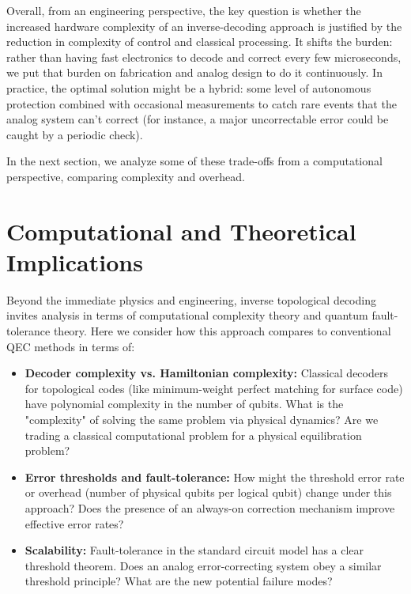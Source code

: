 \documentclass[11pt]{article}
\begin{document}
Overall, from an engineering perspective, the key question is whether the increased hardware complexity of an inverse-decoding approach is justified by the reduction in complexity of control and classical processing. It shifts the burden: rather than having fast electronics to decode and correct every few microseconds, we put that burden on fabrication and analog design to do it continuously. In practice, the optimal solution might be a hybrid: some level of autonomous protection combined with occasional measurements to catch rare events that the analog system can't correct (for instance, a major uncorrectable error could be caught by a periodic check).

In the next section, we analyze some of these trade-offs from a computational perspective, comparing complexity and overhead.

\section{Computational and Theoretical Implications}
Beyond the immediate physics and engineering, inverse topological decoding invites analysis in terms of computational complexity theory and quantum fault-tolerance theory. Here we consider how this approach compares to conventional QEC methods in terms of:
\begin{itemize}
    \item \textbf{Decoder complexity vs. Hamiltonian complexity:} Classical decoders for topological codes (like minimum-weight perfect matching for surface code) have polynomial complexity in the number of qubits. What is the "complexity" of solving the same problem via physical dynamics? Are we trading a classical computational problem for a physical equilibration problem?
    \item \textbf{Error thresholds and fault-tolerance:} How might the threshold error rate or overhead (number of physical qubits per logical qubit) change under this approach? Does the presence of an always-on correction mechanism improve effective error rates?
    \item \textbf{Scalability:} Fault-tolerance in the standard circuit model has a clear threshold theorem. Does an analog error-correcting system obey a similar threshold principle? What are the new potential failure modes?
\end{itemize}
\end{document}
